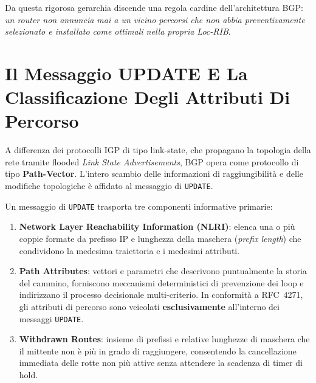 \documentclass[11pt, a4paper]{article}
\begin{document}

Da questa rigorosa gerarchia discende una regola cardine dell'architettura BGP: \emph{un router non annuncia mai a un vicino percorsi che non abbia preventivamente selezionato e installato come ottimali nella propria Loc-RIB}.


\section{Il Messaggio UPDATE E La Classificazione Degli Attributi Di Percorso}

A differenza dei protocolli IGP di tipo link-state, che propagano la topologia della rete tramite flooded \emph{Link State Advertisements}, BGP opera come protocollo di tipo \textbf{Path-Vector}. L'intero scambio delle informazioni di raggiungibilità e delle modifiche topologiche è affidato al messaggio di \texttt{UPDATE}.


Un messaggio di \texttt{UPDATE} trasporta tre componenti informative primarie:
\begin{enumerate}[noitemsep]
    \item \textbf{Network Layer Reachability Information (NLRI)}: elenca una o più coppie formate da prefisso IP e lunghezza della maschera (\emph{prefix length}) che condividono la medesima traiettoria e i medesimi attributi.
    \item \textbf{Path Attributes}: vettori e parametri che descrivono puntualmente la storia del cammino, forniscono meccanismi deterministici di prevenzione dei loop e indirizzano il processo decisionale multi-criterio. In conformità a RFC~4271, gli attributi di percorso sono veicolati \textbf{esclusivamente} all'interno dei messaggi \texttt{UPDATE}.
    \item \textbf{Withdrawn Routes}: insieme di prefissi e relative lunghezze di maschera che il mittente non è più in grado di raggiungere, consentendo la cancellazione immediata delle rotte non più attive senza attendere la scadenza di timer di hold.
\end{enumerate}
\end{document}
